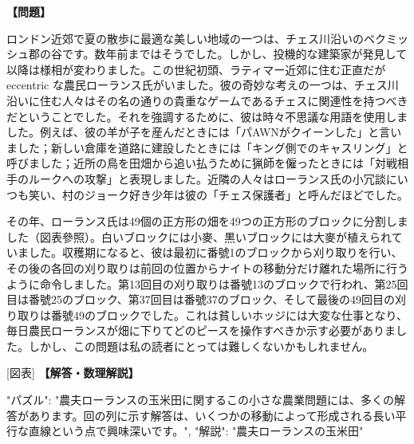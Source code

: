 \documentclass[10pt,a4paper,oneside,openany]{ltjsbook}
\begin{document}
\begin{tcolorbox}[colback=softblue,colframe=primaryblue,title=\textbf{第 335 問：FARMER LAWRENCE'S CORNFIELDS.},arc=2mm,boxrule=1pt,breakable]
\textbf{【問題】}\par\vspace{0.3em}
ロンドン近郊で夏の散歩に最適な美しい地域の一つは、チェス川沿いのベクミッシュ郡の谷です。数年前まではそうでした。しかし、投機的な建築家が発見して以降は様相が変わりました。この世紀初頭、ラティマー近郊に住む正直だが eccentric な農民ローランス氏がいました。彼の奇妙な考えの一つは、チェス川沿いに住む人々はその名の通りの貴重なゲームであるチェスに関連性を持つべきだということでした。それを強調するために、彼は時々不思議な用語を使用しました。例えば、彼の羊が子を産んだときには「パAWNがクイーンした」と言いました；新しい倉庫を道路に建設したときには「キング側でのキャスリング」と呼びました；近所の鳥を田畑から追い払うために猟師を僱ったときには「対戦相手のルークへの攻撃」と表現しました。近隣の人々はローランス氏の小冗談にいつも笑い、村のジョーク好き少年は彼の「チェス保護者」と呼んだほどでした。

その年、ローランス氏は49個の正方形の畑を49つの正方形のブロックに分割しました（図表參照）。白いブロックには小麥、黒いブロックには大麥が植えられていました。収穫期になると、彼は最初に番號1のブロックから刈り取りを行い、その後の各回の刈り取りは前回の位置からナイトの移動分だけ離れた場所に行うように命令しました。第13回目の刈り取りは番號13のブロックで行われ、第25回目は番號25のブロック、第37回目は番號37のブロック、そして最後の49回目の刈り取りは番號49のブロックでした。これは貧しいホッジには大変な仕事となり、毎日農民ローランスが畑に下りてどのピースを操作すべきか示す必要がありました。しかし、この問題は私の読者にとっては難しくないかもしれません。

[図表]
\tcblower
\textbf{【解答・数理解説】}\par\vspace{0.3em}
{
"パズル": "農夫ローランスの玉米田に関するこの小さな農業問題には、多くの解答があります。回の列に示す解答は、いくつかの移動によって形成される長い平行な直線という点で興味深いです。",
"解説": "農夫ローランスの玉米田"
}
\end{tcolorbox}
\end{document}
